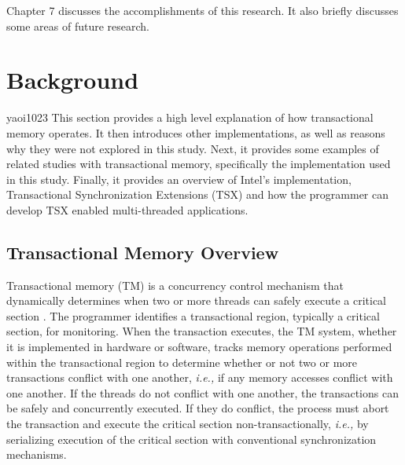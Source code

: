 \documentclass[11pt]{book}
\begin{document}
Chapter 7 discusses the accomplishments of this research.  It also briefly discusses some
areas of future research.


\chapter{Background}

yaoi1023
This section provides a high level explanation of how transactional memory operates.  It
then introduces other implementations, as well as reasons why they were not explored in
this study.  Next, it provides some examples of related studies with transactional memory,
specifically the implementation used in this study.  Finally, it provides an overview of
Intel's implementation, Transactional Synchronization Extensions (TSX) and how the
programmer can develop TSX enabled multi-threaded applications.

\section{Transactional Memory Overview}

Transactional memory (TM) is a concurrency control mechanism that dynamically determines
when two or more threads can safely execute a critical section \cite{sle_rajwar}.  The
programmer identifies a transactional region, typically a critical section, for
monitoring.  When the transaction executes, the TM system, whether it is implemented in
hardware or software, tracks memory operations performed within the transactional region
to determine whether or not two or more transactions conflict with one another,
\emph{i.e.,} if any memory accesses conflict with one another.  If the threads do not
conflict with one another, the transactions can be safely and concurrently executed.  If
they do conflict, the process must abort the transaction and execute the critical section
non-transactionally, \emph{i.e.,} by serializing execution of the critical section with
conventional synchronization mechanisms.

\end{document}
